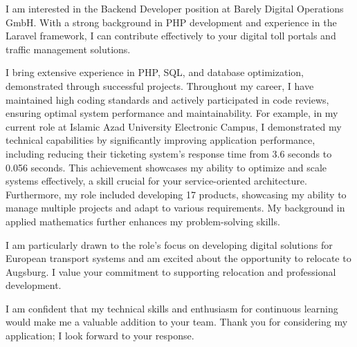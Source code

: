 \documentclass[10pt,stdletter,dateno]{newlfm}
\begin{document}
\begin{newlfm}
    I am interested in the Backend Developer position at Barely Digital Operations GmbH. With a strong background in PHP development and experience in the Laravel framework, I can contribute effectively to your digital toll portals and traffic management solutions.

    I bring extensive experience in PHP, SQL, and database optimization, demonstrated through successful projects. 
    Throughout my career, I have maintained high coding standards and actively participated in code reviews, 
    ensuring optimal system performance and maintainability. For example, in my current role at Islamic Azad University Electronic Campus, I demonstrated my technical capabilities by significantly improving application performance, including reducing their ticketing system's response time from 3.6 seconds to 0.056 seconds. This achievement showcases my ability to optimize and scale systems effectively, a skill crucial for your service-oriented architecture. Furthermore, my role included developing 17 products, showcasing my ability to manage multiple projects and adapt to various requirements. My background in applied mathematics further enhances my problem-solving skills.
   
   I am particularly drawn to the role's focus on developing digital solutions for European transport systems and am excited about the opportunity to relocate to Augsburg. I value your commitment to supporting relocation and professional development.
   
   I am confident that my technical skills and enthusiasm for continuous learning would make me a valuable addition to your team. Thank you for considering my application; I look forward to your response.
   
   
   

\end{newlfm}
\end{document}
